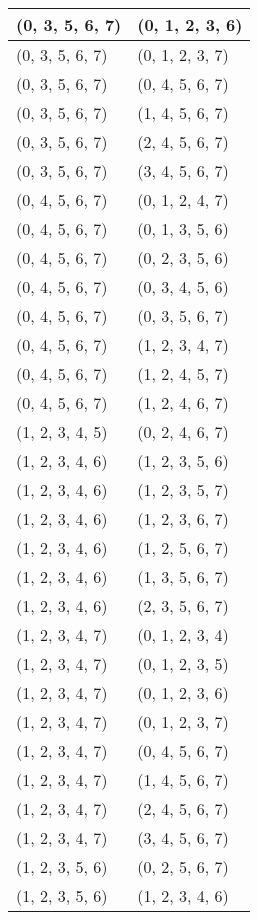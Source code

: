 \begin{footnotesize}
\begin{longtable}[c]{|l|l|}
\\ \hline
(0, 3, 5, 6, 7)
&(0, 1, 2, 3, 6)
\\ \hline
(0, 3, 5, 6, 7)
&(0, 1, 2, 3, 7)
\\ \hline
(0, 3, 5, 6, 7)
&(0, 4, 5, 6, 7)
\\ \hline
(0, 3, 5, 6, 7)
&(1, 4, 5, 6, 7)
\\ \hline
(0, 3, 5, 6, 7)
&(2, 4, 5, 6, 7)
\\ \hline
(0, 3, 5, 6, 7)
&(3, 4, 5, 6, 7)
\\ \hline
(0, 4, 5, 6, 7)
&(0, 1, 2, 4, 7)
\\ \hline
(0, 4, 5, 6, 7)
&(0, 1, 3, 5, 6)
\\ \hline
(0, 4, 5, 6, 7)
&(0, 2, 3, 5, 6)
\\ \hline
(0, 4, 5, 6, 7)
&(0, 3, 4, 5, 6)
\\ \hline
(0, 4, 5, 6, 7)
&(0, 3, 5, 6, 7)
\\ \hline
(0, 4, 5, 6, 7)
&(1, 2, 3, 4, 7)
\\ \hline
(0, 4, 5, 6, 7)
&(1, 2, 4, 5, 7)
\\ \hline
(0, 4, 5, 6, 7)
&(1, 2, 4, 6, 7)
\\ \hline
(1, 2, 3, 4, 5)
&(0, 2, 4, 6, 7)
\\ \hline
(1, 2, 3, 4, 6)
&(1, 2, 3, 5, 6)
\\ \hline
(1, 2, 3, 4, 6)
&(1, 2, 3, 5, 7)
\\ \hline
(1, 2, 3, 4, 6)
&(1, 2, 3, 6, 7)
\\ \hline
(1, 2, 3, 4, 6)
&(1, 2, 5, 6, 7)
\\ \hline
(1, 2, 3, 4, 6)
&(1, 3, 5, 6, 7)
\\ \hline
(1, 2, 3, 4, 6)
&(2, 3, 5, 6, 7)
\\ \hline
(1, 2, 3, 4, 7)
&(0, 1, 2, 3, 4)
\\ \hline
(1, 2, 3, 4, 7)
&(0, 1, 2, 3, 5)
\\ \hline
(1, 2, 3, 4, 7)
&(0, 1, 2, 3, 6)
\\ \hline
(1, 2, 3, 4, 7)
&(0, 1, 2, 3, 7)
\\ \hline
(1, 2, 3, 4, 7)
&(0, 4, 5, 6, 7)
\\ \hline
(1, 2, 3, 4, 7)
&(1, 4, 5, 6, 7)
\\ \hline
(1, 2, 3, 4, 7)
&(2, 4, 5, 6, 7)
\\ \hline
(1, 2, 3, 4, 7)
&(3, 4, 5, 6, 7)
\\ \hline
(1, 2, 3, 5, 6)
&(0, 2, 5, 6, 7)
\\ \hline
(1, 2, 3, 5, 6)
&(1, 2, 3, 4, 6)
\\ \hline

\end{longtable}
\end{footnotesize}
